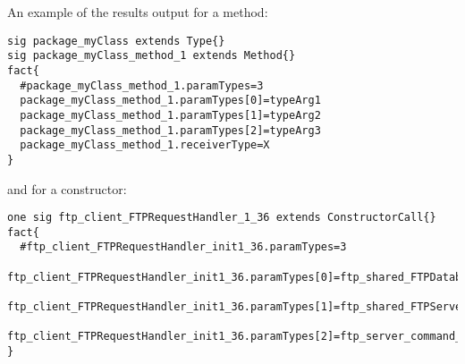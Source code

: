 An example of the results output for a method:\\

\begin{lstlisting}
sig package_myClass extends Type{}
sig package_myClass_method_1 extends Method{}
fact{
  #package_myClass_method_1.paramTypes=3
  package_myClass_method_1.paramTypes[0]=typeArg1
  package_myClass_method_1.paramTypes[1]=typeArg2
  package_myClass_method_1.paramTypes[2]=typeArg3
  package_myClass_method_1.receiverType=X
}
\end{lstlisting}

and for a constructor:\\

\begin{lstlisting}
one sig ftp_client_FTPRequestHandler_1_36 extends ConstructorCall{}
fact{
  #ftp_client_FTPRequestHandler_init1_36.paramTypes=3
  ftp_client_FTPRequestHandler_init1_36.paramTypes[0]=ftp_shared_FTPDatabase
  ftp_client_FTPRequestHandler_init1_36.paramTypes[1]=ftp_shared_FTPServerConfiguration
  ftp_client_FTPRequestHandler_init1_36.paramTypes[2]=ftp_server_command_FTPCommandManager
}
\end{lstlisting}